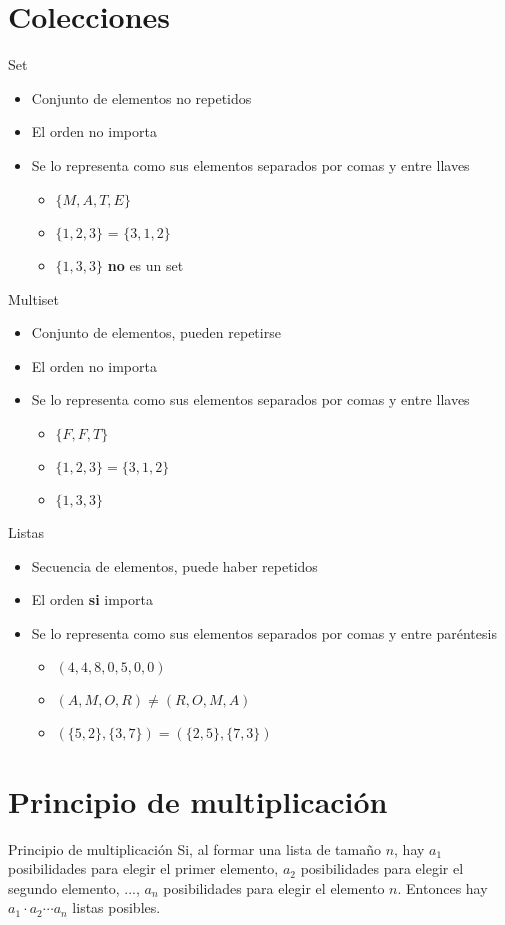 \documentclass[10pt]{beamer}
\newcommand{\bi}{\begin{itemize}}
\newcommand{\ei}{\end{itemize}}
\begin{document}
\section{Colecciones}

\begin{frame}{Set}
  \bi
    \item Conjunto de elementos no repetidos
    \item El orden no importa
    \item Se lo representa como sus elementos separados por comas y entre llaves
    \bi
      \item $\{M, A, T, E\}$
      \item $\{1, 2, 3\}$ = $\{3, 1, 2\}$
      \item $\{1, 3, 3\}$ \textbf{no} es un set
    \ei
  \ei
\end{frame}

\begin{frame}{Multiset}
  \bi
    \item Conjunto de elementos, pueden repetirse
    \item El orden no importa
    \item Se lo representa como sus elementos separados por comas y entre llaves
    \bi
      \item $\{F, F, T\}$
      \item $\{1, 2, 3\} = \{3, 1, 2\}$
      \item $\{1, 3, 3\}$
    \ei
  \ei
\end{frame}

\begin{frame}{Listas}
  \bi
    \item Secuencia de elementos, puede haber repetidos
    \item El orden \textbf{si} importa
    \item Se lo representa como sus elementos separados por comas y entre paréntesis
    \bi
      \item $(4, 4, 8, 0, 5, 0, 0)$
      \item $(A, M, O, R) \neq (R, O, M, A)$
      \item $(\{5, 2\}, \{3, 7\}) = (\{2, 5\}, \{7, 3\})$
    \ei
  \ei
\end{frame}

\section{Principio de multiplicación}

\begin{frame}{Principio de multiplicación}
  Si, al formar una lista de tamaño $n$, hay $a_1$ posibilidades para elegir el primer elemento,
  $a_2$ posibilidades para elegir el segundo elemento, ..., $a_n$ posibilidades para elegir el 
  elemento $n$. Entonces hay $a_1 \cdot a_2 \cdots a_n$ listas posibles.
\end{frame}
\end{document}
